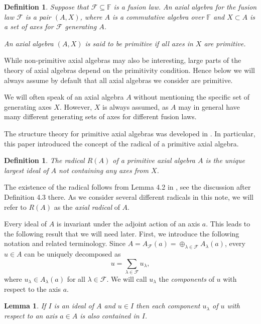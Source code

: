 \documentclass[12pt]{article}
\newtheorem{lemma}[theorem]{Lemma}
\newtheorem{definition}[theorem]{Definition}
\newcommand\F{\mathbb{F}}
\newcommand\cF{\mathcal{F}}
\newcommand\lm{\lambda}
\begin{document}
\begin{definition}
Suppose that $\cF\subseteq\F$ is a fusion law. An axial algebra for the fusion law 
$\cF$ is a pair $(A,X)$, where $A$ is a commutative algebra over $\F$ and $X\subset 
A$ is a set of axes for $\cF$ generating $A$.

An axial algebra $(A,X)$ is said to be \emph{primitive} if all axes in $X$ are 
primitive.
\end{definition}

While non-primitive axial algebras may also be interesting, large parts of the theory 
of axial algebras depend on the primitivity condition. Hence below we will always 
assume by default that all axial algebras we consider are primitive. 

We will often speak of an axial algebra $A$ without mentioning the specific set of 
generating axes $X$. However, $X$ is always assumed, as $A$ may in general have many 
different generating sets of axes for different fusion laws. 

The structure theory for primitive axial algebras was developed in \cite{kms}. In 
particular, this paper introduced the concept of the radical of a primitive axial 
algebra.

\begin{definition}
The \emph{radical} $R(A)$ of a primitive axial algebra $A$ is the unique largest 
ideal of $A$ not containing any axes from $X$.
\end{definition}

The existence of the radical follows from Lemma 4.2 in \cite{kms}, see the discussion 
after Definition 4.3 there. As we consider several different radicals in this note, 
we will refer to $R(A)$ as the \emph{axial radical} of $A$.

Every ideal of $A$ is invariant under the adjoint action of an axis $a$. This leads 
to the following result that we will need later. First, we introduce the following 
notation and related terminology. Since $A=A_\cF(a)=\oplus_{\lm\in\cF}A_\lm(a)$, 
every $u\in A$ can be uniquely decomposed as 
%
$$
u=\sum_{\lm\in\cF}u_\lm,
$$
%
where $u_\lm\in A_\lm(a)$ for all $\lm\in\cF$. We will call $u_\lm$ the 
\emph{components} of $u$ with respect to the axis $a$.

\begin{lemma} \label{component}
If $I$ is an ideal of $A$ and $u\in I$ then each component $u_\lm$ of $u$ with 
respect to an axis $a\in A$ is also contained in $I$.
\end{lemma}
\end{document}
